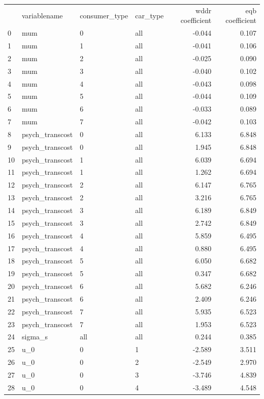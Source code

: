 \begin{tabular}{llllrr}
 & variablename & consumer_type & car_type & wddr coefficient & eqb coefficient \\
0 & mum & 0 & all & -0.044 & 0.107 \\
1 & mum & 1 & all & -0.041 & 0.106 \\
2 & mum & 2 & all & -0.025 & 0.090 \\
3 & mum & 3 & all & -0.040 & 0.102 \\
4 & mum & 4 & all & -0.043 & 0.098 \\
5 & mum & 5 & all & -0.044 & 0.109 \\
6 & mum & 6 & all & -0.033 & 0.089 \\
7 & mum & 7 & all & -0.042 & 0.103 \\
8 & psych_transcost & 0 & all & 6.133 & 6.848 \\
9 & psych_transcost & 0 & all & 1.945 & 6.848 \\
10 & psych_transcost & 1 & all & 6.039 & 6.694 \\
11 & psych_transcost & 1 & all & 1.262 & 6.694 \\
12 & psych_transcost & 2 & all & 6.147 & 6.765 \\
13 & psych_transcost & 2 & all & 3.216 & 6.765 \\
14 & psych_transcost & 3 & all & 6.189 & 6.849 \\
15 & psych_transcost & 3 & all & 2.742 & 6.849 \\
16 & psych_transcost & 4 & all & 5.859 & 6.495 \\
17 & psych_transcost & 4 & all & 0.880 & 6.495 \\
18 & psych_transcost & 5 & all & 6.050 & 6.682 \\
19 & psych_transcost & 5 & all & 0.347 & 6.682 \\
20 & psych_transcost & 6 & all & 5.682 & 6.246 \\
21 & psych_transcost & 6 & all & 2.409 & 6.246 \\
22 & psych_transcost & 7 & all & 5.935 & 6.523 \\
23 & psych_transcost & 7 & all & 1.953 & 6.523 \\
24 & sigma_s & all & all & 0.244 & 0.385 \\
25 & u_0 & 0 & 1 & -2.589 & 3.511 \\
26 & u_0 & 0 & 2 & -2.549 & 2.970 \\
27 & u_0 & 0 & 3 & -3.746 & 4.839 \\
28 & u_0 & 0 & 4 & -3.489 & 4.548 \\

\end{tabular}

